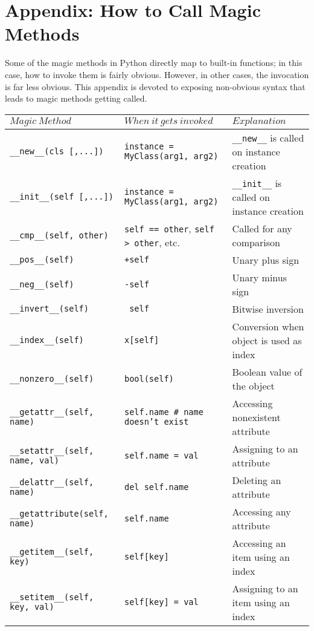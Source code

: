 \documentclass[a4paper,11pt]{article}
\newcommand{\code}[1]{\texttt{#1}}
\begin{document}
\newpage
\section{Appendix: How to Call Magic Methods}

Some of the magic methods in Python directly map to built-in functions; in this case, how to invoke them is fairly obvious. However, in other cases, the invocation is far less obvious. This appendix is devoted to exposing non-obvious syntax that leads to magic methods getting called.
\begin{center}
\begin{tabular}{| p{5cm} | p{5cm} | p{5cm} |}
\hline
$Magic\ Method$ & $When\ it\ gets\ invoked$ & $Explanation$\\
\hline
\code{__new__(cls [,...])} & \code{instance = MyClass(arg1, arg2)} & \code{__new__} is called on instance creation\\
\hline
\code{__init__(self [,...])} & \code{instance = MyClass(arg1, arg2)} & \code{__init__} is called on instance creation\\
\hline
\code{__cmp__(self, other)} & \code{self == other}, \code{self > other}, etc. & Called for any comparison\\
\hline
\code{__pos__(self)} & \code{+self} & Unary plus sign\\
\hline
\code{__neg__(self)} & \code{-self} & Unary minus sign\\
\hline
\code{__invert__(self)} & \code{~self} & Bitwise inversion\\
\hline
\code{__index__(self)} & \code{x[self]} & Conversion when object is used as index\\
\hline
\code{__nonzero__(self)} & \code{bool(self)} & Boolean value of the object\\
\hline
\code{__getattr__(self, name)} & \code{self.name \# name doesn't exist} & Accessing nonexistent attribute\\
\hline
\code{__setattr__(self, name, val)} & \code{self.name = val} & Assigning to an attribute\\
\hline
\code{__delattr__(self, name)} & \code{del self.name} & Deleting an attribute\\
\hline
\code{__getattribute(self, name)} & \code{self.name} & Accessing any attribute\\
\hline
\code{__getitem__(self, key)} & \code{self[key]} & Accessing an item using an index\\
\hline
\code{__setitem__(self, key, val)} & \code{self[key] = val} & Assigning to an item using an index\\

\end{tabular}
\end{center}
\end{document}
